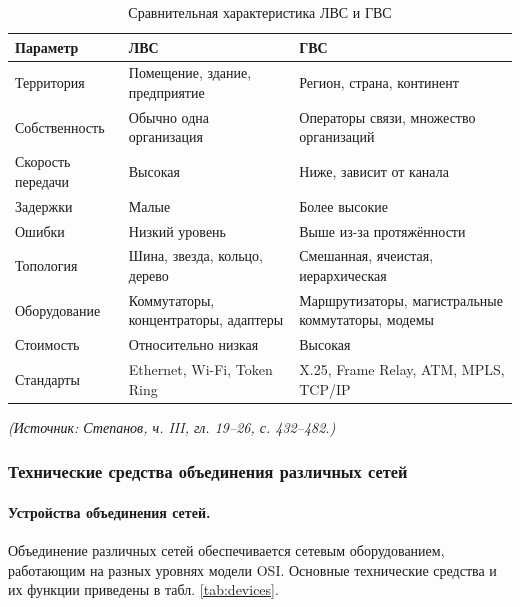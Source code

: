 \documentclass[a4paper,12pt]{article}
\begin{document}
\begin{table}[h]
\centering
\caption{Сравнительная характеристика ЛВС и ГВС}
\label{tab:lan-wan}
\begin{tabular}{p{3cm}p{4.5cm}p{4.5cm}}
\toprule
\textbf{Параметр} & \textbf{ЛВС} & \textbf{ГВС} \\
\midrule
Территория & Помещение, здание, предприятие & Регион, страна, континент \\
Собственность & Обычно одна организация & Операторы связи, множество организаций \\
Скорость передачи & Высокая & Ниже, зависит от канала \\
Задержки & Малые & Более высокие \\
Ошибки & Низкий уровень & Выше из-за протяжённости \\
Топология & Шина, звезда, кольцо, дерево & Смешанная, ячеистая, иерархическая \\
Оборудование & Коммутаторы, концентраторы, адаптеры & Маршрутизаторы, магистральные коммутаторы, модемы \\
Стоимость & Относительно низкая & Высокая \\
Стандарты & Ethernet, Wi-Fi, Token Ring & X.25, Frame Relay, ATM, MPLS, TCP/IP \\
\bottomrule
\end{tabular}
\end{table}

\textit{(Источник: Степанов, ч. III, гл. 19–26, с. 432–482.)}

\subsubsection{Технические средства объединения различных сетей}

\paragraph{Устройства объединения сетей.}
Объединение различных сетей обеспечивается сетевым оборудованием, работающим на разных уровнях модели OSI. Основные технические средства и их функции приведены в табл. \ref{tab:devices}.
\end{document}
